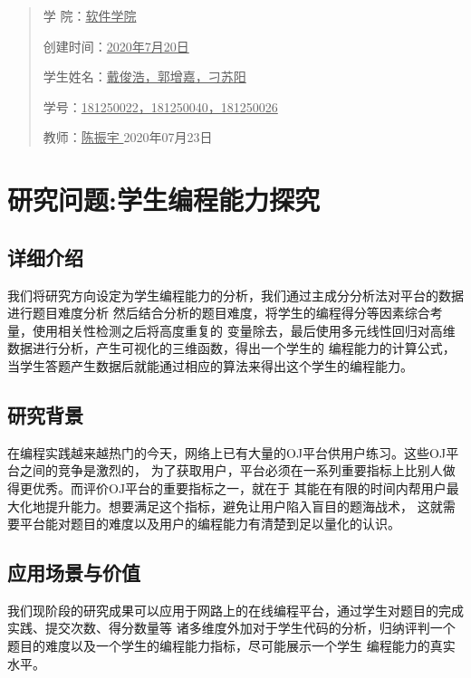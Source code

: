 \documentclass[UTF8]{ctexart}
\begin{document}
\begin{quotation}
    \songti \fontsize{15}{15}
    \doublespacing
    \par\setlength\parindent{12em}
    \quad 

    学\hspace{0.61cm} 院：\underline{\quad 软件学院\quad}

    创建时间：\underline{2020年7月20日}

    学生姓名：\underline{戴俊浩，郭增嘉，刁苏阳}

    学\hspace{0.61cm}号：\underline{\small 181250022，181250040，181250026}

    教\hspace{0.61cm}师：\underline{\qquad 陈振宇 \qquad}
    \vskip 2cm
    \centering
    2020年07月23日
\end{quotation}

\newpage
\tableofcontents
\newpage
\section{研究问题:学生编程能力探究}
\subsection{详细介绍}
我们将研究方向设定为学生编程能力的分析，我们通过主成分分析法对平台的数据进行题目难度分析
然后结合分析的题目难度，将学生的编程得分等因素综合考量，使用相关性检测之后将高度重复的
变量除去，最后使用多元线性回归对高维数据进行分析，产生可视化的三维函数，得出一个学生的
编程能力的计算公式，当学生答题产生数据后就能通过相应的算法来得出这个学生的编程能力。
\subsection{研究背景}
在编程实践越来越热门的今天，网络上已有大量的OJ平台供用户练习。这些OJ平台之间的竞争是激烈的，
为了获取用户，平台必须在一系列重要指标上比别人做得更优秀。而评价OJ平台的重要指标之一，就在于
其能在有限的时间内帮用户最大化地提升能力。想要满足这个指标，避免让用户陷入盲目的题海战术，
这就需要平台能对题目的难度以及用户的编程能力有清楚到足以量化的认识。
\subsection{应用场景与价值}
我们现阶段的研究成果可以应用于网路上的在线编程平台，通过学生对题目的完成实践、提交次数、得分数量等
诸多维度外加对于学生代码的分析，归纳评判一个题目的难度以及一个学生的编程能力指标，尽可能展示一个学生
编程能力的真实水平。
\end{document}
